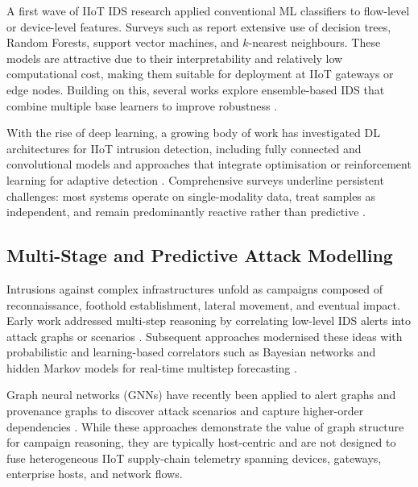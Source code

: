 \documentclass[pdflatex,sn-mathphys-num]{sn-jnl}
\theoremstyle{thmstyleone}%
\theoremstyle{thmstyletwo}%
\theoremstyle{thmstylethree}%
\begin{document}
A first wave of IIoT IDS research applied conventional ML classifiers to flow-level or device-level features. Surveys such as \cite{rahman2025idsiot,gyamfi2022intrusionIot,jawad2025nidsiiot} report extensive use of decision trees, Random Forests, support vector machines, and $k$-nearest neighbours. These models are attractive due to their interpretability and relatively low computational cost, making them suitable for deployment at IIoT gateways or edge nodes. Building on this, several works explore ensemble-based IDS that combine multiple base learners to improve robustness \cite{mohyeddine2023ensembleIiot,nuaimi2023ensembleIiot,almotairi2024stackedIotIds,golchha2023ensembleBigdata,fraihat2023iotNetflowIds}.

With the rise of deep learning, a growing body of work has investigated DL architectures for IIoT intrusion detection, including fully connected and convolutional models \cite{alotaibi2023iiotSurvey,nandanwar2024attacknet,hossain2025dlIotIds} and approaches that integrate optimisation or reinforcement learning for adaptive detection \cite{gaber2023iiotPsoBatIds,gueriani2024drlSurveyIot}. Comprehensive surveys underline persistent challenges: most systems operate on single-modality data, treat samples as independent, and remain predominantly reactive rather than predictive \cite{alotaibi2023iiotSurvey,anwer2025advancedIiotIds,jawad2025nidsiiot}.

\subsection{Multi-Stage and Predictive Attack Modelling}
Intrusions against complex infrastructures unfold as campaigns composed of reconnaissance, foothold establishment, lateral movement, and eventual impact. Early work addressed multi-step reasoning by correlating low-level IDS alerts into attack graphs or scenarios \cite{wang2006attackgraphs,ning2004attackgraphdistance,roschke2011alertcorr}. Subsequent approaches modernised these ideas with probabilistic and learning-based correlators such as Bayesian networks and hidden Markov models for real-time multistep forecasting \cite{holgado2017multistep,ghafir2019hmmAPT}. 

Graph neural networks (GNNs) have recently been applied to alert graphs and provenance graphs to discover attack scenarios and capture higher-order dependencies \cite{cheng2021alertgcn,anjum2022anubis,wang2025provgraphAPT}. While these approaches demonstrate the value of graph structure for campaign reasoning, they are typically host-centric and are not designed to fuse heterogeneous IIoT supply-chain telemetry spanning devices, gateways, enterprise hosts, and network flows.
\end{document}
